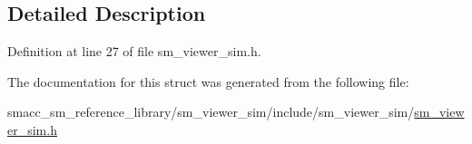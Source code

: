 \subsection{Detailed Description}


Definition at line 27 of file sm\+\_\+viewer\+\_\+sim.\+h.



The documentation for this struct was generated from the following file\+:\begin{DoxyCompactItemize}
\item 
smacc\+\_\+sm\+\_\+reference\+\_\+library/sm\+\_\+viewer\+\_\+sim/include/sm\+\_\+viewer\+\_\+sim/\hyperlink{sm__viewer__sim_8h}{sm\+\_\+viewer\+\_\+sim.\+h}\end{DoxyCompactItemize}
